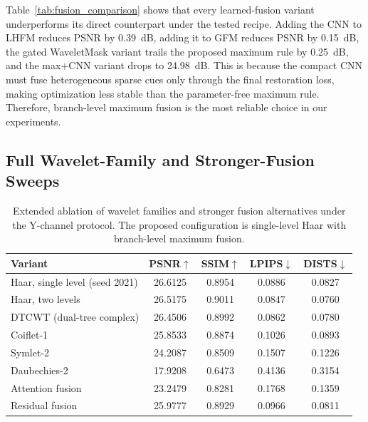 {Table~\ref{tab:fusion_comparison} shows that every learned-fusion variant underperforms its direct counterpart under the tested recipe. Adding the CNN to LHFM reduces PSNR by 0.39~dB, adding it to GFM reduces PSNR by 0.15~dB, the gated WaveletMask variant trails the proposed maximum rule by 0.25~dB, and the max+CNN variant drops to 24.98~dB. This is because the compact CNN must fuse heterogeneous sparse cues only through the final restoration loss, making optimization less stable than the parameter-free maximum rule. Therefore, branch-level maximum fusion is the most reliable choice in our experiments.

\subsection{Full Wavelet-Family and Stronger-Fusion Sweeps}\label{subsec:wavelet_family_analysis}

\begin{table}[H]
\caption{Extended ablation of wavelet families and stronger fusion alternatives under the Y-channel protocol. The proposed configuration is single-level Haar with branch-level maximum fusion.\label{tab:followup_ablations}}
\footnotesize
\begin{tabularx}{\textwidth}{lCCCC}
\toprule
\textbf{Variant} & \textbf{PSNR$\uparrow$} & \textbf{SSIM$\uparrow$} & \textbf{LPIPS$\downarrow$} & \textbf{DISTS$\downarrow$} \\
\midrule
Haar, single level (seed 2021) & 26.6125 & 0.8954 & 0.0886 & 0.0827 \\
Haar, two levels & 26.5175 & 0.9011 & 0.0847 & 0.0760 \\
DTCWT (dual-tree complex) & 26.4506 & 0.8992 & 0.0862 & 0.0780 \\
Coiflet-1 & 25.8533 & 0.8874 & 0.1026 & 0.0893 \\
Symlet-2 & 24.2087 & 0.8509 & 0.1507 & 0.1226 \\
Daubechies-2 & 17.9208 & 0.6473 & 0.4136 & 0.3154 \\
\midrule
Attention fusion & 23.2479 & 0.8281 & 0.1768 & 0.1359 \\
Residual fusion & 25.9777 & 0.8929 & 0.0966 & 0.0811 \\
\bottomrule
\end{tabularx}
\normalsize
\end{table}

}
